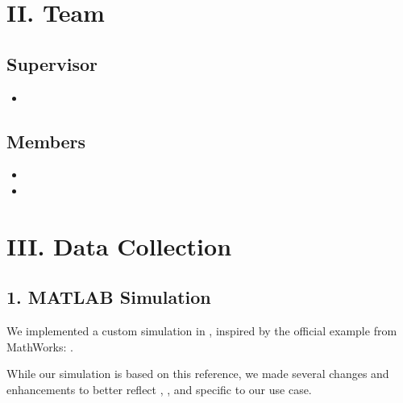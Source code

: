 \documentclass[letterpaper,10pt,english]{sphinxmanual}
\begin{document}
\chapter{II. Team}
\label{\detokenize{index:ii-team}}

\section{Supervisor}
\label{\detokenize{index:supervisor}}\begin{itemize}
\item {} 
\sphinxAtStartPar
{}

\end{itemize}


\section{Members}
\label{\detokenize{index:members}}\begin{itemize}
\item {} 
\sphinxAtStartPar
{}

\item {} 
\sphinxAtStartPar
{}

\end{itemize}


\chapter{III. Data Collection}
\label{\detokenize{index:iii-data-collection}}

\section{1. MATLAB Simulation}
\label{\detokenize{index:matlab-simulation}}
\sphinxAtStartPar
We implemented a custom  simulation in , inspired by the official example from MathWorks:
.

\sphinxAtStartPar
While our simulation is based on this reference, we made several changes and enhancements to better reflect , , and  specific to our use case.
\end{document}
